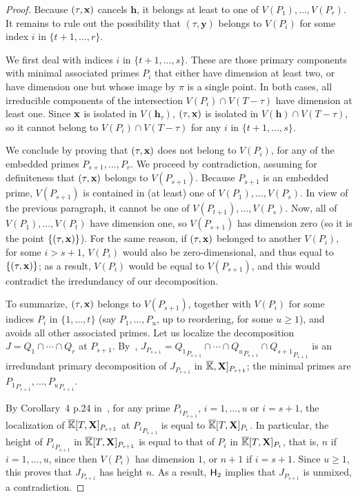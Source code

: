 \documentclass[11pt]{article}
\numberwithin{Property}{section}
\numberwithin{Theorem}{section}
\numberwithin{Proposition}{section}
\numberwithin{Lemma}{section}
\numberwithin{Corollary}{section}
\numberwithin{Definition}{section}
\numberwithin{Remark}{section}
\numberwithin{Conjecture}{section}
\numberwithin{Problem}{section}
\numberwithin{Claim}{section}
\theoremstyle{definition}
\numberwithin{Example}{section}
\def\y {\ensuremath{\mathbf{y}}}
\def\h {\ensuremath{\mathbf{h}}}
\renewcommand{\ge}{\geqslant}
\def\bar{\overline}
\renewcommand{\ge}{\geqslant} %
\newcommand{\field}{\mathbb{K}} %
\newcommand{\mat}[1]{\mathbf{\MakeUppercase{#1}}} %
\begin{document}
\begin{proof}
 Because $(\tau,{\bf x})$ cancels $\h$, it belongs at least to one of
  $V(P_1),\dots,V(P_r)$. It remains to rule out the possibility that
  $(\tau,\y)$ belongs to $V(P_i)$ for some index $i$ in
  $\{t+1,\dots,r\}$.
  
We first deal with indices $i$ in $\{t+1,\dots,s\}$. These are those
  primary components with minimal associated primes $P_i$ that either
  have dimension at least two, or have dimension one but whose image
  by $\pi$ is a single point. In both cases, all irreducible
  components of the intersection $V(P_i)\cap V(T-\tau)$ have dimension
  at least one. Since ${\bf x}$ is isolated in $V(\h_\tau)$, $(\tau,{\bf x})$ is
  isolated in $V(\h)\cap V(T-\tau)$, so it cannot belong to
  $V(P_i)\cap V(T-\tau)$ for any $i$ in $\{t+1,\dots,s\}$.
  
  
  We conclude by proving that $(\tau,{\bf x})$ does not belong to $V(P_i)$,
  for any of the embedded primes $P_{s+1},\dots,P_r$. We proceed by
  contradiction, assuming for definiteness that $(\tau,{\bf x})$ belongs to
  $V(P_{s+1})$. Because $P_{s+1}$ is an embedded prime, $V(P_{s+1})$
  is contained in (at least) one of $V(P_1),\dots,V(P_s)$. In view of
  the previous paragraph, it cannot be one of
  $V(P_{t+1}),\dots,V(P_s)$.  Now, all of $V(P_1),\dots,V(P_t)$ have
  dimension one, so $V(P_{s+1})$ has dimension zero (so it is the point $\{(\tau,{\bf x})\}$). For the same
  reason, if $(\tau,{\bf x})$ belonged to another $V(P_i)$, for some $i >
  s+1$, $V(P_i)$ would also be zero-dimensional, and thus equal to $\{(\tau,{\bf x})\}$; as a result, $V(P_i)$
  would be equal to $V(P_{s+1})$, and this would contradict the
  irredundancy of our decomposition.
  
   To summarize, $(\tau,{\bf x})$ belongs to $V(P_{s+1})$, together with
  $V(P_i)$ for some indices $P_i$ in $\{1,\dots,t\}$ (say
  $P_1,\dots,P_u$, up to reordering, for some $u \ge 1$), and avoids
  all other associated primes.  Let us localize the decomposition
  $J=Q_1 \cap \cdots \cap Q_r$ at
  $P_{s+1}$. By~\cite[Proposition~4.9]{AtMc},
  $J_{P_{s+1}}={Q_1}_{P_{s+1}} \cap \cdots \cap {Q_u}_{P_{s+1}}\cap
  {Q_{s+1}}_{P_{s+1}}$ is an irredundant primary decomposition of
  $J_{P_{s+1}}$ in $\bar{\field},\mat{X}]_{P_{s+1}}$; the minimal primes are
  ${P_1}_{P_{s+1}},\dots,{P_u}_{P_{s+1}}$.
  
  By Corollary~4 p.24 in~\cite{Matsumura86}, for any prime
  ${P_i}_{P_{s+1}}$, $i=1,\dots,u$ or $i=s+1$, the localization of
  $\bar{\field}[T,\mat{X}]_{P_{s+1}}$ at ${P_i}_{P_{s+1}}$ is equal to
  $\bar{\field}[T,\mat{X}]_{P_{i}}$. In particular, the height of ${P_i}_{P_{s+1}}$
  in $\bar{\field}[T,\mat{X}]_{P_{s+1}}$ is equal to that of $P_i$ in
  $\bar{\field}[T,\mat{X}]_{P_{i}}$, that is, $n$ if $i=1,\dots,u$, since then
  $V(P_i)$ has dimension $1$, or $n+1$ if $i=s+1$. Since $u \ge 1$,
  this proves that $J_{P_{s+1}}$ has height $n$. As a result, ${\sf
    H}_2$ implies that $J_{P_{s+1}}$ is unmixed, a contradiction.
\end{proof}
\end{document}

